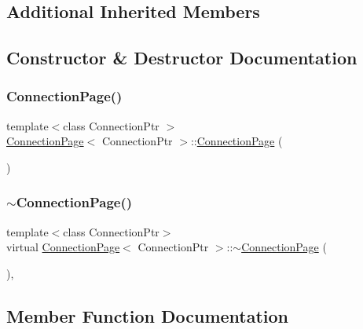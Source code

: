 \subsection*{Additional Inherited Members}


\subsection{Constructor \& Destructor Documentation}
\mbox{\label{classConnectionPage_aa23481432cf05cb07269ec54ea317972}} 
\subsubsection{\texorpdfstring{Connection\+Page()}{ConnectionPage()}}
{\footnotesize\ttfamily template$<$class Connection\+Ptr $>$ \\
\mbox{\hyperlink{classConnectionPage}{Connection\+Page}}$<$ Connection\+Ptr $>$\+::\mbox{\hyperlink{classConnectionPage}{Connection\+Page}} (\begin{DoxyParamCaption}{ }\end{DoxyParamCaption})}

\mbox{\label{classConnectionPage_aac26ceb81eee9366599d251d375bbbbf}} 
\subsubsection{\texorpdfstring{$\sim$\+Connection\+Page()}{~ConnectionPage()}}
{\footnotesize\ttfamily template$<$class Connection\+Ptr$>$ \\
virtual \mbox{\hyperlink{classConnectionPage}{Connection\+Page}}$<$ Connection\+Ptr $>$\+::$\sim$\mbox{\hyperlink{classConnectionPage}{Connection\+Page}} (\begin{DoxyParamCaption}{ }\end{DoxyParamCaption})\hspace{0.3cm}{\ttfamily [inline]}, {\ttfamily [virtual]}}



\subsection{Member Function Documentation}
\mbox{\label{classConnectionPage_a1442489fbf0e3332d08d588a246445e6}} 
